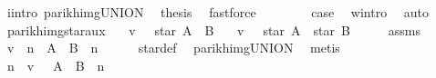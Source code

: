 \begin{isabellebody}
\ i{\isacharunderscore}{\kern0pt}intro\ parikh{\isacharunderscore}{\kern0pt}img{\isacharunderscore}{\kern0pt}UNION\ \isamarkupfalse%
\ {\isacharquery}{\kern0pt}thesis\ \isamarkupfalse%
\ fastforce\isanewline
\ \ \isamarkupfalse%
\isanewline
\ \ \isamarkupfalse%
\ \isamarkupfalse%
\ {\isacharquery}{\kern0pt}case\ \isamarkupfalse%
\ w{\isacharunderscore}{\kern0pt}intro\ \isamarkupfalse%
\ auto\isanewline
{}\isamarkupfalse%
%
\endisatagproof
{\isafoldproof}%
%
\isadelimproof
\isanewline
%
\endisadelimproof
\isanewline
{}\isamarkupfalse%
\ parikh{\isacharunderscore}{\kern0pt}img{\isacharunderscore}{\kern0pt}star{\isacharunderscore}{\kern0pt}aux{}{\isacharcolon}{\kern0pt}\isanewline
\ \ \ {\isachardoublequoteopen}v\ {\isasymin}\ {\isasymPsi}\ {\isacharparenleft}{\kern0pt}star\ {\isacharparenleft}{\kern0pt}A\ {\isasymunion}\ B{\isacharparenright}{\kern0pt}{\isacharparenright}{\kern0pt}{\isachardoublequoteclose}\isanewline
\ \ \ {\isachardoublequoteopen}v\ {\isasymin}\ {\isasymPsi}\ {\isacharparenleft}{\kern0pt}star\ A\ {\isacharat}{\kern0pt}{\isacharat}{\kern0pt}\ star\ B{\isacharparenright}{\kern0pt}{\isachardoublequoteclose}\isanewline
%
\isadelimproof
%
\endisadelimproof
%
\isatagproof
{}\isamarkupfalse%
\ {\isacharminus}{\kern0pt}\isanewline
\ \ \isamarkupfalse%
\ assms\ \isamarkupfalse%
\ {\isachardoublequoteopen}v\ {\isasymin}\ {\isacharparenleft}{\kern0pt}{\isasymUnion}n{\isachardot}{\kern0pt}\ {\isasymPsi}\ {\isacharparenleft}{\kern0pt}{\isacharparenleft}{\kern0pt}A\ {\isasymunion}\ B{\isacharparenright}{\kern0pt}\ {\isacharcircum}{\kern0pt}{\isacharcircum}{\kern0pt}\ n{\isacharparenright}{\kern0pt}{\isacharparenright}{\kern0pt}{\isachardoublequoteclose}\isanewline
\ \ \ \ \isamarkupfalse%
\ star{\isacharunderscore}{\kern0pt}def\ \isamarkupfalse%
\ parikh{\isacharunderscore}{\kern0pt}img{\isacharunderscore}{\kern0pt}UNION\ \isamarkupfalse%
\ metis\isanewline
\ \ \isamarkupfalse%
\ \isamarkupfalse%
\ n\ \ {\isachardoublequoteopen}v\ {\isasymin}\ {\isasymPsi}\ {\isacharparenleft}{\kern0pt}{\isacharparenleft}{\kern0pt}A\ {\isasymunion}\ B{\isacharparenright}{\kern0pt}\ {\isacharcircum}{\kern0pt}{\isacharcircum}{\kern0pt}\ n{\isacharparenright}{\kern0pt}{\isachardoublequoteclose}\ \isamarkupfalse%

\end{isabellebody}
